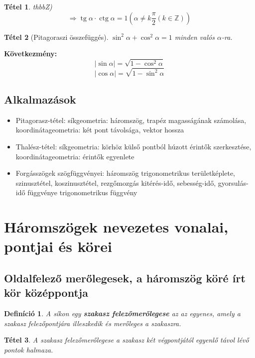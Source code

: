 \documentclass[12pt,a4paper]{article}
\newtheorem{theorem}{Tétel} [section]
\newtheorem{definition}{Definíció} [section]
\DeclareMathOperator{\tg}{tg}
\DeclareMathOperator{\ctg}{ctg}
\begin{document}
\begin{theorem}
thbb{Z})\]
\[\Rightarrow  \tg\alpha\cdot\ctg \alpha=1\left(\alpha\neq k\dfrac{\pi}{2}(k\in\mathbb{Z})\right)\]
\end{theorem}

\begin{theorem}[Pitagoraszi összefüggés]
$\sin^2\alpha+\cos^2\alpha=1$ minden valós $\alpha$-ra.
\end{theorem}
\textbf{Következmény:}
\[|\sin \alpha|=\sqrt{1-\cos^2\alpha}\]
\[|\cos \alpha|=\sqrt{1-\sin^2\alpha}\]

\subsection{Alkalmazások}
\begin{itemize}
\item Pitagorasz-tétel: síkgeometria: háromszög, trapéz magasságának számolása, koordinátageometria: két pont távolsága, vektor hossza
\item Thalész-tétel: síkgeometria: körhöz külső pontból húzott érintők szerkesztése, koordinátageometria: érintők egyenlete
\item Forgásszögek szögfüggvényei: háromszög trigonometrikus területképlete, szinusztétel, koszinusztétel, rezgőmozgás kitérés-idő, sebesség-idő, gyorsulás-idő függvénye trigonometrikus függvény
\end{itemize}
\newpage






\section{Háromszögek nevezetes vonalai, pontjai és körei}

\subsection{Oldalfelező merőlegesek, a háromszög köré írt kör középpontja}
\begin{definition}
A síkon egy \textbf{szakasz felezőmerőlegese} az az egyenes, amely a szakasz felezőpontjára illeszkedik és merőleges a szakaszra.
\end{definition}

\begin{theorem}
A szakasz felezőmerőlegese a szakasz két végpontjától egyenlő távol lévő pontok halmaza.
\end{theorem}
\end{document}
